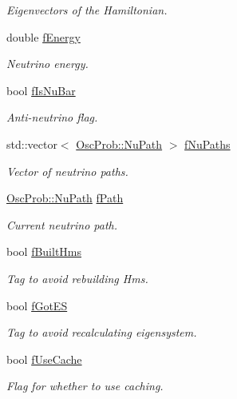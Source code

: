 \begin{DoxyCompactItemize}
\begin{DoxyCompactList}\small\item\em Eigenvectors of the Hamiltonian. \end{DoxyCompactList}\item 
double \hyperlink{classOscProb_1_1PMNS__Base_a2800af6d436972f3e900867790c046b0}{f\+Energy}
\begin{DoxyCompactList}\small\item\em Neutrino energy. \end{DoxyCompactList}\item 
bool \hyperlink{classOscProb_1_1PMNS__Base_a0ebaeaefab36a3ff381c6293faedfdd6}{f\+Is\+Nu\+Bar}
\begin{DoxyCompactList}\small\item\em Anti-\/neutrino flag. \end{DoxyCompactList}\item 
std\+::vector$<$ \hyperlink{structOscProb_1_1NuPath}{Osc\+Prob\+::\+Nu\+Path} $>$ \hyperlink{classOscProb_1_1PMNS__Base_a69db9d57e12fc7cbe0431bc6c18fac93}{f\+Nu\+Paths}
\begin{DoxyCompactList}\small\item\em Vector of neutrino paths. \end{DoxyCompactList}\item 
\hyperlink{structOscProb_1_1NuPath}{Osc\+Prob\+::\+Nu\+Path} \hyperlink{classOscProb_1_1PMNS__Base_a849437aa8891fe042e86886ce8f81c6e}{f\+Path}
\begin{DoxyCompactList}\small\item\em Current neutrino path. \end{DoxyCompactList}\item 
bool \hyperlink{classOscProb_1_1PMNS__Base_a9ac3cadeac8db1b90f3152f476244780}{f\+Built\+Hms}
\begin{DoxyCompactList}\small\item\em Tag to avoid rebuilding Hms. \end{DoxyCompactList}\item 
bool \hyperlink{classOscProb_1_1PMNS__Base_a6dc5cd010d2d70b2324745b4e53e9839}{f\+Got\+ES}
\begin{DoxyCompactList}\small\item\em Tag to avoid recalculating eigensystem. \end{DoxyCompactList}\item 
bool \hyperlink{classOscProb_1_1PMNS__Base_ad28c12ef897b5555eda509ea55c99107}{f\+Use\+Cache}
\begin{DoxyCompactList}\small\item\em Flag for whether to use caching. \end{DoxyCompactList}\item 

\end{DoxyCompactItemize}

